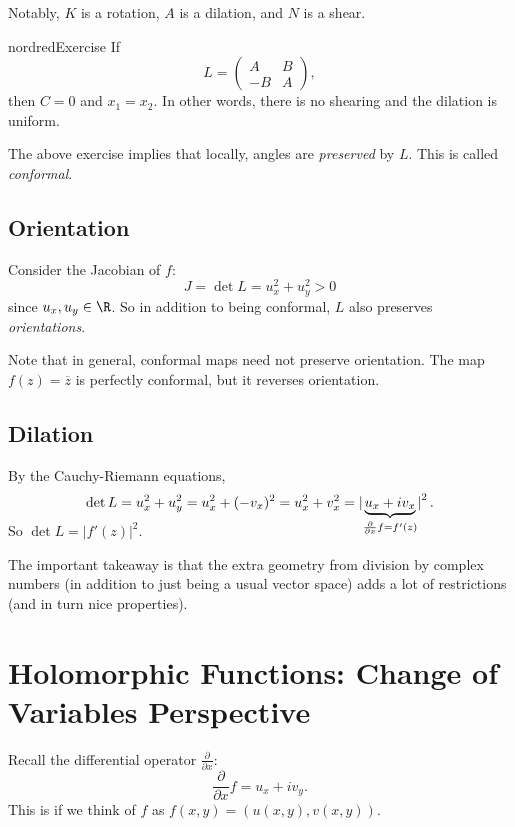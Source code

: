 Notably, $K$ is a rotation, $A$ is a dilation, and $N$
is a shear.

\begin{mybox}{nordred}{Exercise}
  If
  \[
  L =
  \left(\begin{matrix}
      A & B \\
      -B & A
  \end{matrix}\right)
  ,\]
  then $C = 0$ and $x_1 = x_2$. In other words, there
  is no shearing and the dilation is uniform.
\end{mybox}

The above exercise implies that locally, angles are
\textit{preserved} by $L$. This is called
\textit{conformal}.

\subsection{Orientation}
Consider the Jacobian of $f$:
\[
J = \det L = u_x^2 + u_y^2 > 0
\]
since $u_x, u_y \in \R$. So in addition to being
conformal, $L$ also preserves \textit{orientations}.

Note that in general, conformal maps need not preserve
orientation. The map $f(z) = \overline{z}$ is perfectly
conformal, but it reverses orientation.

\subsection{Dilation}
By the Cauchy-Riemann equations,
\[
\det L = u_x^2 + u_y^2 = u_x^2 + (-v_x)^2
= u_x^2 + v_x^2 = \left\lvert\smash[b]{\underbrace{u_x + iv_x}_{\frac{\partial}{\partial x} f = f'(z)}}\right\rvert^2
.\]
So $\det L = |f'(z)|^2$.

The important takeaway is that the extra geometry from
division by complex numbers (in addition to just being a
usual vector space) adds a lot of restrictions (and
in turn nice properties).

\section{Holomorphic Functions: Change of Variables Perspective}
Recall the differential operator
$\frac{\partial}{\partial x}$:
\[
\frac{\partial}{\partial x} f = u_x + iv_y
.\]
This is if we think of $f$ as
$f(x, y) = (u(x, y), v(x, y))$.

